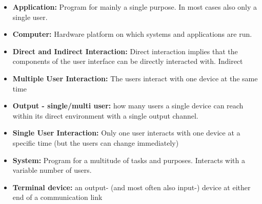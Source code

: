 \begin{itemize}
\item \textbf{Application:} Program for mainly a single purpose. In most cases also only a single user.
\item \textbf{Computer:} Hardware platform on which systems and applications are run.
\item \textbf{Direct and Indirect Interaction:} Direct interaction implies that the components of the user interface can be directly interacted with. Indirect 
\item \textbf{Multiple User Interaction:} The users interact with one device at the same time 
\item \textbf{Output - single/multi user:} how many users a single device can reach within its direct environment with a single output channel.
\item \textbf{Single User Interaction:} Only one user interacts with one device  at a specific time (but the users can change immediately)
\item \textbf{System:} Program for a multitude of tasks and purposes. Interacts with a variable number of users.
\item \textbf{Terminal device:} an output- (and most often also input-) device at either end of a communication link
\end{itemize}